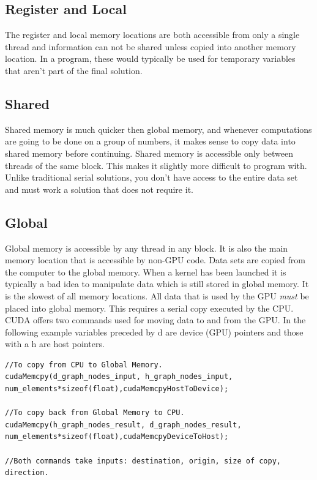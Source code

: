 \documentclass{article}
\newcommand{\comp}[1]{{\ttfamily #1}}
\begin{document}
      \subsection{Register and Local}
	  The register and local memory locations are both accessible from only a single thread and information can not be shared unless copied into another memory location. In a program, these would typically be used for temporary variables that aren't part of the final solution. 
      \subsection{Shared}
      Shared memory is much quicker then global memory, and whenever computations are going to be done on a group of numbers, it makes sense to copy data into shared memory before continuing. Shared memory is accessible only between threads of the same block. This makes it slightly more difficult to program with. Unlike traditional serial solutions, you don't have access to the entire data set and must work a solution that does not require it.
      \subsection{Global}
      Global memory is accessible by any thread in any block. It is also the main memory location that is accessible by non-GPU code. Data sets are copied from the computer to the global memory. When a kernel has been launched it is typically a bad idea to manipulate data which is still stored in global memory. It is the slowest of all memory locations. All data that is used by the GPU \emph{must} be placed into global memory. This requires a serial copy executed by the CPU. CUDA offers two commands used for moving data to and from the GPU. In the following example variables preceded by \comp{d} are device (GPU) pointers and those with a \comp{h} are host pointers.
	  \begin{lstlisting}
//To copy from CPU to Global Memory.	
cudaMemcpy(d_graph_nodes_input, h_graph_nodes_input, num_elements*sizeof(float),cudaMemcpyHostToDevice);

//To copy back from Global Memory to CPU.	
cudaMemcpy(h_graph_nodes_result, d_graph_nodes_result, num_elements*sizeof(float),cudaMemcpyDeviceToHost);

//Both commands take inputs: destination, origin, size of copy, direction.
	  \end{lstlisting}
	
\end{document}
